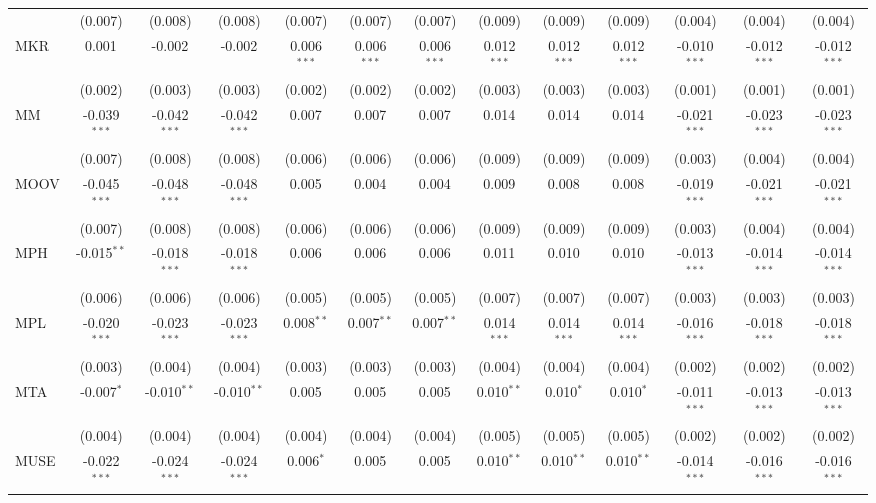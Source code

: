 \begin{table}[!htbp]
\begin{tabular}{@{\extracolsep{5pt}}lcccccccccccc}
  & (0.007) & (0.008) & (0.008) & (0.007) & (0.007) & (0.007) & (0.009) & (0.009) & (0.009) & (0.004) & (0.004) & (0.004) \\
 MKR & 0.001$^{}$ & -0.002$^{}$ & -0.002$^{}$ & 0.006$^{***}$ & 0.006$^{***}$ & 0.006$^{***}$ & 0.012$^{***}$ & 0.012$^{***}$ & 0.012$^{***}$ & -0.010$^{***}$ & -0.012$^{***}$ & -0.012$^{***}$ \\
  & (0.002) & (0.003) & (0.003) & (0.002) & (0.002) & (0.002) & (0.003) & (0.003) & (0.003) & (0.001) & (0.001) & (0.001) \\
 MM & -0.039$^{***}$ & -0.042$^{***}$ & -0.042$^{***}$ & 0.007$^{}$ & 0.007$^{}$ & 0.007$^{}$ & 0.014$^{}$ & 0.014$^{}$ & 0.014$^{}$ & -0.021$^{***}$ & -0.023$^{***}$ & -0.023$^{***}$ \\
  & (0.007) & (0.008) & (0.008) & (0.006) & (0.006) & (0.006) & (0.009) & (0.009) & (0.009) & (0.003) & (0.004) & (0.004) \\
 MOOV & -0.045$^{***}$ & -0.048$^{***}$ & -0.048$^{***}$ & 0.005$^{}$ & 0.004$^{}$ & 0.004$^{}$ & 0.009$^{}$ & 0.008$^{}$ & 0.008$^{}$ & -0.019$^{***}$ & -0.021$^{***}$ & -0.021$^{***}$ \\
  & (0.007) & (0.008) & (0.008) & (0.006) & (0.006) & (0.006) & (0.009) & (0.009) & (0.009) & (0.003) & (0.004) & (0.004) \\
 MPH & -0.015$^{**}$ & -0.018$^{***}$ & -0.018$^{***}$ & 0.006$^{}$ & 0.006$^{}$ & 0.006$^{}$ & 0.011$^{}$ & 0.010$^{}$ & 0.010$^{}$ & -0.013$^{***}$ & -0.014$^{***}$ & -0.014$^{***}$ \\
  & (0.006) & (0.006) & (0.006) & (0.005) & (0.005) & (0.005) & (0.007) & (0.007) & (0.007) & (0.003) & (0.003) & (0.003) \\
 MPL & -0.020$^{***}$ & -0.023$^{***}$ & -0.023$^{***}$ & 0.008$^{**}$ & 0.007$^{**}$ & 0.007$^{**}$ & 0.014$^{***}$ & 0.014$^{***}$ & 0.014$^{***}$ & -0.016$^{***}$ & -0.018$^{***}$ & -0.018$^{***}$ \\
  & (0.003) & (0.004) & (0.004) & (0.003) & (0.003) & (0.003) & (0.004) & (0.004) & (0.004) & (0.002) & (0.002) & (0.002) \\
 MTA & -0.007$^{*}$ & -0.010$^{**}$ & -0.010$^{**}$ & 0.005$^{}$ & 0.005$^{}$ & 0.005$^{}$ & 0.010$^{**}$ & 0.010$^{*}$ & 0.010$^{*}$ & -0.011$^{***}$ & -0.013$^{***}$ & -0.013$^{***}$ \\
  & (0.004) & (0.004) & (0.004) & (0.004) & (0.004) & (0.004) & (0.005) & (0.005) & (0.005) & (0.002) & (0.002) & (0.002) \\
 MUSE & -0.022$^{***}$ & -0.024$^{***}$ & -0.024$^{***}$ & 0.006$^{*}$ & 0.005$^{}$ & 0.005$^{}$ & 0.010$^{**}$ & 0.010$^{**}$ & 0.010$^{**}$ & -0.014$^{***}$ & -0.016$^{***}$ & -0.016$^{***}$ \\

\end{tabular}
\end{table}
